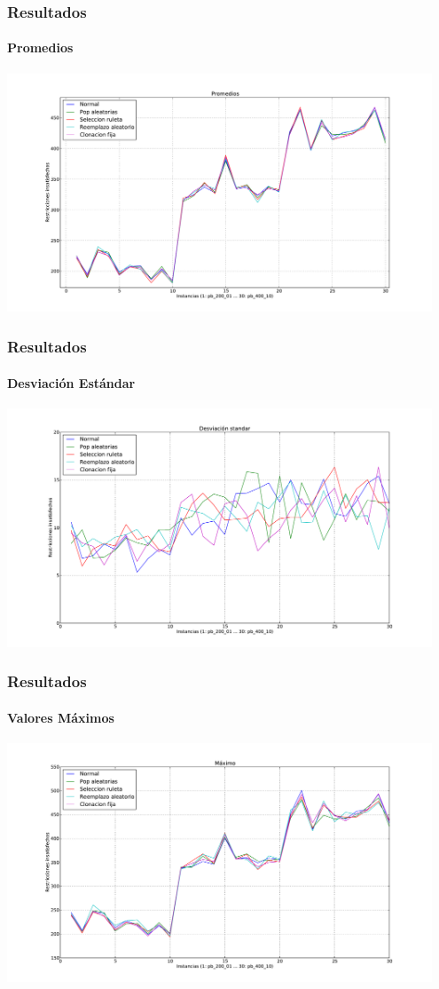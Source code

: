 \frame
{
\frametitle{Resultados}
\framesubtitle{Promedios}
\begin{center}
\includegraphics[width=0.95\textwidth]{../doc/img/promedio.pdf}
\end{center}

}

\frame
{
\frametitle{Resultados}
\framesubtitle{Desviación Estándar}
\begin{center}
\includegraphics[width=0.95\textwidth]{../doc/img/s.pdf}
\end{center}

}

\frame
{
\frametitle{Resultados}
\framesubtitle{Valores Máximos}
\begin{center}
\includegraphics[width=0.95\textwidth]{../doc/img/max.pdf}
\end{center}

}

